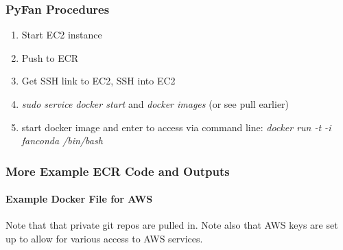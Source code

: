 \documentclass[
]{book}
\providecommand{\tightlist}{%
  \setlength{\itemsep}{0pt}\setlength{\parskip}{0pt}}
\begin{document}
\hypertarget{pyfan-procedures}{%
\subsubsection{PyFan Procedures}\label{pyfan-procedures}}

\begin{enumerate}
\def\labelenumi{\arabic{enumi}.}
\tightlist
\item
  Start EC2 instance
\item
  Push to ECR
\item
  Get SSH link to EC2, SSH into EC2
\item
  \emph{sudo service docker start} and \emph{docker images} (or see pull earlier)
\item
  start docker image and enter to access via command line: \emph{docker run -t -i fanconda /bin/bash}
\end{enumerate}

\hypertarget{more-example-ecr-code-and-outputs}{%
\subsubsection{More Example ECR Code and Outputs}\label{more-example-ecr-code-and-outputs}}

\hypertarget{example-docker-file-for-aws}{%
\paragraph{Example Docker File for AWS}\label{example-docker-file-for-aws}}

Note that that private git repos are pulled in. Note also that AWS keys are set up to allow for various access to AWS services.
\end{document}
